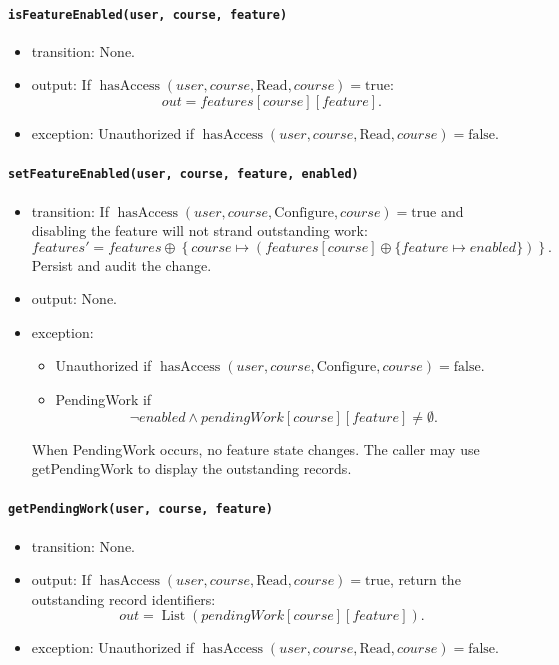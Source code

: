 \documentclass[12pt, titlepage]{article}
\begin{document}
\paragraph{\texttt{isFeatureEnabled(user, course, feature)}}
\begin{itemize}
    \item transition: None.

    \item output: If $\operatorname{hasAccess}(user,course,\text{Read},course)=\text{true}$:
    \[
    out=\mathit{features}[course][feature].
    \]

    \item exception: Unauthorized if $\operatorname{hasAccess}(user,course,\text{Read},course)=\text{false}$.
\end{itemize}

\paragraph{\texttt{setFeatureEnabled(user, course, feature, enabled)}}
\begin{itemize}
    \item transition: If $\operatorname{hasAccess}(user,course,\text{Configure},course)=\text{true}$ and disabling the feature will not strand outstanding work:
    \[
    \mathit{features}'=
    \mathit{features}\oplus
    \left\{
    course\mapsto
    \left(
    \mathit{features}[course]\oplus
    \{feature\mapsto enabled\}
    \right)
    \right\}.
    \]
    Persist and audit the change.

    \item output: None.

    \item exception:
    \begin{itemize}
        \item Unauthorized if $\operatorname{hasAccess}(user,course,\text{Configure},course)=\text{false}$.
        \item PendingWork if
        \[
        \neg enabled\land
        \mathit{pendingWork}[course][feature]
        \ne\emptyset.
        \]
    \end{itemize}
    When PendingWork occurs, no feature state changes. The caller may use getPendingWork to display the outstanding records.
\end{itemize}

\paragraph{\texttt{getPendingWork(user, course, feature)}}
\begin{itemize}
    \item transition: None.

    \item output: If $\operatorname{hasAccess}(user,course,\text{Read},course)=\text{true}$,
    return the outstanding record identifiers:
    \[
    out=\operatorname{List}
    (\mathit{pendingWork}[course][feature]).
    \]

    \item exception: Unauthorized if $\operatorname{hasAccess}(user,course,\text{Read},course)=\text{false}$.
\end{itemize}
\end{document}
